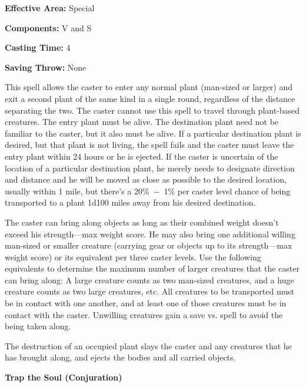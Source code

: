 \begin{multicols}{2}
\begin{minipage}{\columnwidth}
\noindent \textbf{Effective Area:} Special

\noindent \textbf{Components:} V and S

\noindent \textbf{Casting Time:} 4

\noindent \textbf{Saving Throw:} None

\end{minipage}

This spell allows the caster to enter any normal plant (man-sized or larger) and exit a second plant of the same kind in a single round, regardless of the distance separating the two.  The caster cannot use this spell to travel through plant-based creatures.  The entry plant must be alive.  The destination plant need not be familiar to the caster, but it also must be alive.  If a particular destination plant is desired, but that plant is not living, the spell fails and the caster must leave the entry plant within 24 hours or he is ejected.  If the caster is uncertain of the location of a particular destination plant, he merely needs to designate direction and distance and he will be moved as close as possible to the desired location, usually within 1 mile, but there's a 20\%~$-$~1\% per caster level chance of being transported to a plant 1d100 miles away from his desired destination.

The caster can bring along objects as long as their combined weight doesn't exceed his strength---max weight score.  He may also bring one additional willing man-sized or smaller creature (carrying gear or objects up to its strength---max weight score) or its equivalent per three caster levels.  Use the following equivalents to determine the maximum number of larger creatures that the caster can bring along: A large creature counts as two man-sized creatures, and a huge creature counts as two large creatures, etc.  All creatures to be transported must be in contact with one another, and at least one of those creatures must be in contact with the caster.  Unwilling creatures gain a save vs. spell to avoid the being taken along.

The destruction of an occupied plant slays the caster and any creatures that he has brought along, and ejects the bodies and all carried objects.


\vspace{1em}

\noindent
\begin{minipage}{\columnwidth}

\noindent \textbf{Trap the Soul (Conjuration)}


\end{minipage}
\end{multicols}
